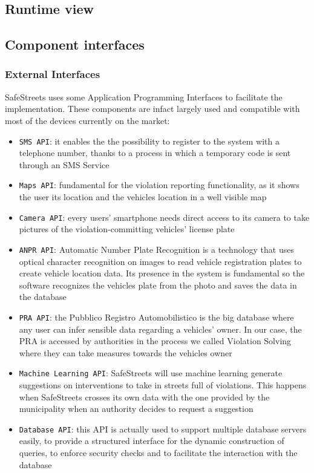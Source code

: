 \documentclass[12pt,a4paper]{article}
\begin{document}
\subsection{Runtime view}
\subsection{Component interfaces}
\subsubsection{External Interfaces}
SafeStreets uses some Application Programming Interfaces to facilitate the implementation. These components are infact largely used and compatible with most of the devices currently on the market:
\begin{itemize}
\item \texttt{SMS API}: it enables the the possibility to register to the system with a telephone number, thanks to a process in which a temporary code is sent through an SMS Service
\item \texttt{Maps API}: fundamental for the violation reporting functionality, as it shows the user its location and the vehicles location in a well visible map
\item \texttt{Camera API}: every users' smartphone needs direct access to its camera to take pictures of the violation-committing vehicles' license plate
\item \texttt{ANPR API}: Automatic Number Plate Recognition is a technology that uses optical character recognition on images to read vehicle registration plates to create vehicle location data. Its presence in the system is fundamental so the software recognizes the vehicles plate from the photo and saves the data in the database 
\item \texttt{PRA API}: the Pubblico Registro Automobilistico is the big database where any user can infer sensible data regarding a vehicles' owner. In our case, the PRA is accessed by authorities in the process we called Violation Solving where they can take measures towards the vehicles owner
\item \texttt{Machine Learning API}: SafeStreets will use machine learning generate suggestions on interventions to take in streets full of violations. This happens when SafeStreets crosses its own data with the one provided by the municipality when an authority decides to request a suggestion
\item \texttt{Database API}: this API is actually used to support multiple database servers easily, to provide a structured interface for the dynamic construction of queries, to enforce security checks and to facilitate the interaction with the database
\end{itemize}
\newpage
\end{document}
